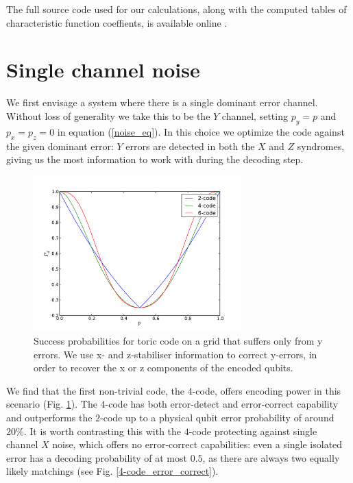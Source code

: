 The full source code used for our calculations, along with the computed tables of characteristic function coeffients, is available online \cite{?}.

\section{Single channel noise}

We first envisage a system where there is a single dominant error channel. Without loss of generality we take this to be the $Y$ channel, setting $p_y = p$ and $p_x = p_z = 0$ in equation (\ref{noise_eq}). In this choice we optimize the code against the given dominant error: $Y$ errors are detected in both the $X$ and $Z$ syndromes, giving us the most information to work with during the decoding step.

\begin{figure}[htb]
  \begin{center}
    \includegraphics[width=8cm]{assets/y_truthful.pdf}
  \end{center}
  \caption{Success probabilities for toric code on a grid that suffers only from y errors. We use x- and  z-stabiliser information to correct y-errors, in order to recover the x or z components of the encoded qubits.}
  \label{y_truthful}
\end{figure}

We find that the first non-trivial code, the $4$-code, offers encoding power in this scenario (Fig. \ref{y_truthful}). The $4$-code has both error-detect and error-correct capability and outperforms the $2$-code up to a physical qubit error probability of around $20\%$. It is worth contrasting this with the $4$-code protecting against single channel $X$ noise, which offers no error-correct capabilities: even a single isolated error has a decoding probability of at most $0.5$, as there are always two equally likely matchings (see Fig. \ref{4-code_error_correct}).

